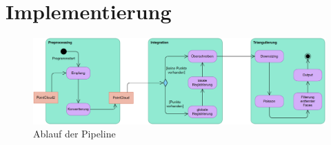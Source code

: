 
\chapter{Implementierung}
\label{ch:implementierung}

\begin{figure}[ht]
	\centering
	\includegraphics[width=\textwidth]{images/pipeline.png}
	\caption{Ablauf der Pipeline}
	\label{fig:pipeline}
\end{figure}
